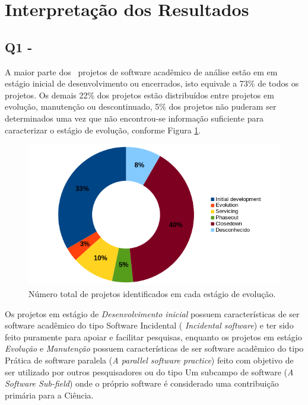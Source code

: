 
\section{Interpretação dos Resultados} \label{estudo3:interpretacao} %

\subsection{Q1 - \EstudoTresQuestaoUm}

A maior parte dos \SoftwareCount \ projetos de software acadêmico de análise estão em
em estágio inicial de desenvolvimento ou encerrados, isto equivale a
73\% de todos os projetos. Os demais 22\% dos projetos estão distribuídos entre
projetos em evolução, manutenção ou descontinuado, 5\% dos projetos não puderam
ser determinados uma vez que não encontrou-se informação suficiente para
caracterizar o estágio de evolução,
conforme Figura \ref{life-cycle}.

\begin{figure}[h]
  \begin{minipage}{0.5\textwidth}
    \centering
    \includegraphics[scale=0.55]{imagens/life-cycle-pie.png}
  \end{minipage}
  \begin{minipage}{0.5\textwidth}
    \centering
    
  \end{minipage}
  \caption{Número total de projetos identificados em cada estágio de evolução.}
  \label{life-cycle}
\end{figure}

Os projetos em estágio de {\it Desenvolvimento inicial} possuem
características de ser software acadêmico do tipo Software Incidental ({\it
Incidental software}) e ter sido feito puramente para apoiar e facilitar
pesquisas, enquanto os projetos em estágio {\it Evolução} e {\it Manutenção}
possuem características de ser software acadêmico do tipo Prática de software
paralela ({\it A parallel software practice}) feito com objetivo de ser
utilizado por outros pesquisadores ou do tipo Um subcampo de software ({\it A Software
Sub-field}) onde o próprio software é considerado uma contribuição primária
para a Ciência.

